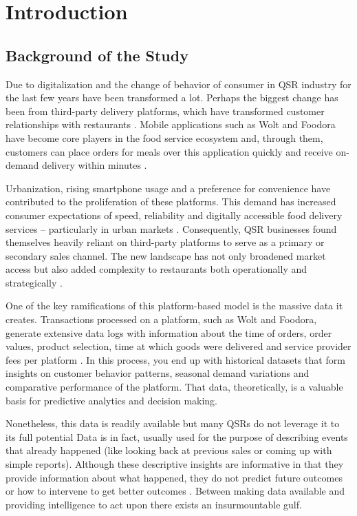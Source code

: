 \section{Introduction}

\subsection{Background of the Study}

Due to digitalization and the change of behavior of consumer in QSR industry for the last few years \citep{govender2024digital} have been transformed a lot. Perhaps the biggest change has been from third-party delivery platforms, which have transformed customer relationships with restaurants \citep{meemken2022research}. Mobile applications such as Wolt and Foodora have become core players in the food service ecosystem and, through them, customers can place orders for meals over this application quickly and receive on-demand delivery within minutes \citep{simonovits2022uberisation, tuomi2023riding}.

Urbanization, rising smartphone usage and a preference for convenience have contributed to the proliferation of these platforms. This demand has increased consumer expectations of speed, reliability and digitally accessible food delivery services -- particularly in urban markets \citep{siddiqi2024investigating}. Consequently, QSR businesses found themselves heavily reliant on third-party platforms to serve as a primary or secondary sales channel. The new landscape has not only broadened market access but also added complexity to restaurants both operationally and strategically \citep{sun2022too}.

One of the key ramifications of this platform-based model is the massive data it creates. Transactions processed on a platform, such as Wolt and Foodora, generate extensive data logs with information about the time of orders, order values, product selection, time at which goods were delivered and service provider fees per platform \citep{nayak2024future}. In this process, you end up with historical datasets that form insights on customer behavior patterns, seasonal demand variations and comparative performance of the platform. That data, theoretically, is a valuable basis for predictive analytics and decision making.

Nonetheless, this data is readily available but many QSRs do not leverage it to its full potential \citep{almeida2023time,nayak2022restaurant} Data is in fact, usually used for the purpose of describing events that already happened (like looking back at previous sales or coming up with simple reports). Although these descriptive insights are informative in that they provide information about what happened, they do not predict future outcomes or how to intervene to get better outcomes \citep{ma2020making, roy2022complete}. Between making data available and providing intelligence to act upon there exists an insurmountable gulf.




